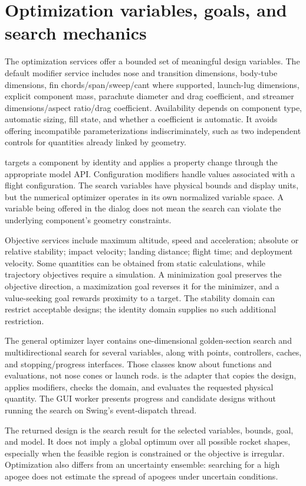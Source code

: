 \section{Optimization variables, goals, and search mechanics}
The optimization services offer a bounded set of meaningful design variables. The default modifier service includes nose and transition dimensions, body-tube dimensions, fin chords/span/sweep/cant where supported, launch-lug dimensions, explicit component mass, parachute diameter and drag coefficient, and streamer dimensions/aspect ratio/drag coefficient. Availability depends on component type, automatic sizing, fill state, and whether a coefficient is automatic. It avoids offering incompatible parameterizations indiscriminately, such as two independent controls for quantities already linked by geometry.

 targets a component by identity and applies a property change through the appropriate model API. Configuration modifiers handle values associated with a flight configuration. The search variables have physical bounds and display units, but the numerical optimizer operates in its own normalized variable space. A variable being offered in the dialog does not mean the search can violate the underlying component's geometry constraints.

Objective services include maximum altitude, speed and acceleration; absolute or relative stability; impact velocity; landing distance; flight time; and deployment velocity. Some quantities can be obtained from static calculations, while trajectory objectives require a simulation. A minimization goal preserves the objective direction, a maximization goal reverses it for the minimizer, and a value-seeking goal rewards proximity to a target. The stability domain can restrict acceptable designs; the identity domain supplies no such additional restriction.

The general optimizer layer contains one-dimensional golden-section search and multidirectional search for several variables, along with points, controllers, caches, and stopping/progress interfaces. Those classes know about functions and evaluations, not nose cones or launch rods.  is the adapter that copies the design, applies modifiers, checks the domain, and evaluates the requested physical quantity. The GUI worker presents progress and candidate designs without running the search on Swing's event-dispatch thread.

The returned design is the search result for the selected variables, bounds, goal, and model. It does not imply a global optimum over all possible rocket shapes, especially when the feasible region is constrained or the objective is irregular. Optimization also differs from an uncertainty ensemble: searching for a high apogee does not estimate the spread of apogees under uncertain conditions.

